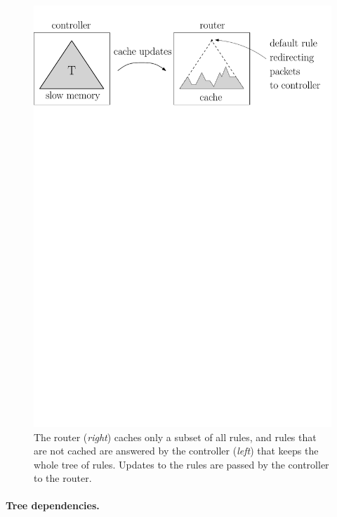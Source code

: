 \begin{figure}[t]
  \centering
  \includegraphics[width=0.9\columnwidth,keepaspectratio]{figs/cache-management/router}
  \caption{The router (\emph{right}) caches only a subset of all rules, and
  rules that are not cached are answered by the controller (\emph{left}) that
  keeps the whole tree of rules. Updates to the rules are passed by the
  controller to the router.}
  \label{fig:motivation}
\end{figure}


\paragraph{Tree dependencies.}

